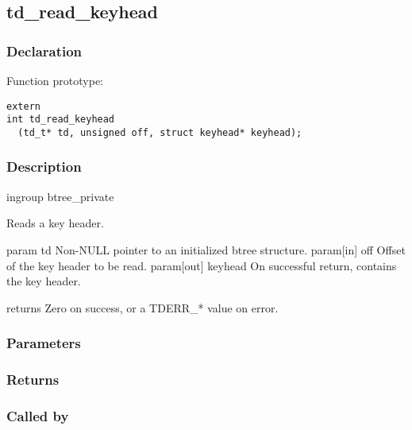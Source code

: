 
\newpage
\subsection{td\_read\_keyhead}
\subsubsection{Declaration} Function prototype:

\begin{verbatim}
extern
int td_read_keyhead
  (td_t* td, unsigned off, struct keyhead* keyhead);
\end{verbatim}

\subsubsection{Description}


 ingroup btree\_private

 Reads a key header.

 param td Non-NULL pointer to an initialized btree structure.
 param[in] off Offset of the key header to be read.
 param[out] keyhead On successful return, contains the key header.

 returns Zero on success, or a TDERR\_* value on error.
 

\subsubsection{Parameters}
\subsubsection{Returns}
\subsubsection{Called by}

